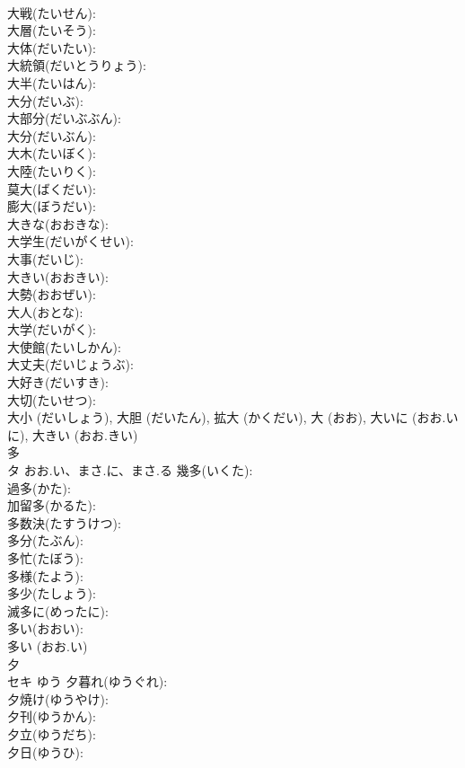 \documentclass[8pt]{extreport}
\begin{document}
\begin{CJK}{UTF8}{min}
\\	大戦(たいせん): 
\\	大層(たいそう): 
\\	大体(だいたい): 
\\	大統領(だいとうりょう): 
\\	大半(たいはん): 
\\	大分(だいぶ): 
\\	大部分(だいぶぶん): 
\\	大分(だいぶん): 
\\	大木(たいぼく): 
\\	大陸(たいりく): 
\\	莫大(ばくだい): 
\\	膨大(ぼうだい): 
\\	大きな(おおきな): 
\\	大学生(だいがくせい): 
\\	大事(だいじ): 
\\	大きい(おおきい): 
\\	大勢(おおぜい): 
\\	大人(おとな): 
\\	大学(だいがく): 
\\	大使館(たいしかん): 
\\	大丈夫(だいじょうぶ): 
\\	大好き(だいすき): 
\\	大切(たいせつ): 
\\	大小 (だいしょう), 大胆 (だいたん), 拡大 (かくだい), 大 (おお), 大いに (おお.いに), 大きい (おお.きい)
\\	多			
\\	タ	おお.い、まさ.に、まさ.る	幾多(いくた): 
\\	過多(かた): 
\\	加留多(かるた): 
\\	多数決(たすうけつ): 
\\	多分(たぶん): 
\\	多忙(たぼう): 
\\	多様(たよう): 
\\	多少(たしょう): 
\\	滅多に(めったに): 
\\	多い(おおい): 
\\	多い (おお.い)
\\	夕			
\\	セキ	ゆう	夕暮れ(ゆうぐれ): 
\\	夕焼け(ゆうやけ): 
\\	夕刊(ゆうかん): 
\\	夕立(ゆうだち): 
\\	夕日(ゆうひ): 

\end{CJK}
\end{document}
